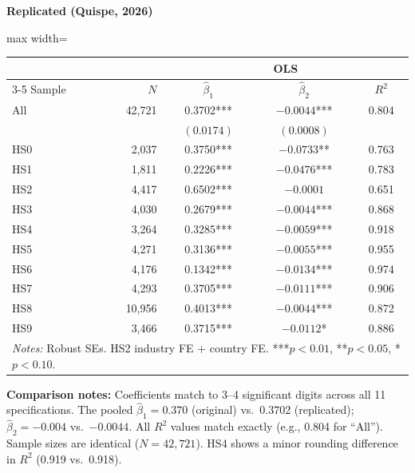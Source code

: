 \documentclass[11pt,a4paper]{article}
\begin{document}
\begin{minipage}[t]{0.48\textwidth}
\centering
\textbf{\large Replicated (Quispe, 2026)}
\vspace{0.3cm}

\begin{adjustbox}{max width=\textwidth}
\begin{tabular}{lrccc}
\toprule
& & \multicolumn{3}{c}{OLS} \\
\cmidrule(lr){3-5}
Sample & $N$ & $\hat{\beta}_1$ & $\hat{\beta}_2$ & $R^2$ \\
\midrule
All    & 42,721 & 0.3702*** & $-0.0044$*** & 0.804 \\
 &        & $(0.0174)$ & $(0.0008)$ & \\
HS0    &  2,037 & 0.3750*** & $-0.0733$** & 0.763 \\
HS1    &  1,811 & 0.2226*** & $-0.0476$*** & 0.783 \\
HS2    &  4,417 & 0.6502*** & $-0.0001$ & 0.651 \\
HS3    &  4,030 & 0.2679*** & $-0.0044$*** & 0.868 \\
HS4    &  3,264 & 0.3285*** & $-0.0059$*** & 0.918 \\
HS5    &  4,271 & 0.3136*** & $-0.0055$*** & 0.955 \\
HS6    &  4,176 & 0.1342*** & $-0.0134$*** & 0.974 \\
HS7    &  4,293 & 0.3705*** & $-0.0111$*** & 0.906 \\
HS8    & 10,956 & 0.4013*** & $-0.0044$*** & 0.872 \\
HS9    &  3,466 & 0.3715*** & $-0.0112$* & 0.886 \\
\bottomrule
\multicolumn{5}{p{0.95\textwidth}}{\footnotesize\textit{Notes:} Robust SEs. HS2 industry FE $+$ country FE. ***$p<0.01$, **$p<0.05$, *$p<0.10$.}
\end{tabular}
\end{adjustbox}
\end{minipage}

\vspace{1cm}
\textbf{Comparison notes:} Coefficients match to 3--4 significant digits across all 11 specifications. The pooled $\hat{\beta}_1 = 0.370$ (original) vs.\ $0.3702$ (replicated); $\hat{\beta}_2 = -0.004$ vs.\ $-0.0044$. All $R^2$ values match exactly (e.g., 0.804 for ``All''). Sample sizes are identical ($N = 42{,}721$). HS4 shows a minor rounding difference in $R^2$ (0.919 vs.\ 0.918).

\newpage

\end{document}
